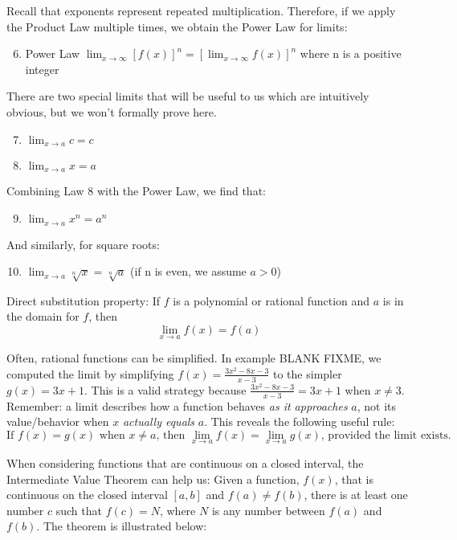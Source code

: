 Recall that exponents represent repeated multiplication. Therefore, if we apply the Product Law multiple times, we obtain the Power Law for limits:
\begin{enumerate}
    \setcounter{enumi}{5}
    \item Power Law $\lim_{x\to\infty} \left[f(x)\right]^n = \left[\lim_{x\to\infty}f(x)\right]^n$ where n is a positive integer
\end{enumerate}
There are two special limits that will be useful to us which are intuitively obvious, but we won't formally prove here.  
\begin{enumerate}
    \setcounter{enumi}{6}
    \item $\lim_{x\to a} \textit{c} = \textit{c}$
    \item $\lim_{x\to a} x = a$
\end{enumerate}
Combining Law 8 with the Power Law, we find that:
\begin{enumerate}
\setcounter{enumi}{8}
    \item $\lim_{x\to a} x^n = a^n$
\end{enumerate}
And similarly, for square roots:
\begin{enumerate}
    \setcounter{enumi}{9}
    \item $\lim_{x\to a} \sqrt[n]{x} = \sqrt[n]{a}$ (if n is even, we assume $a > 0$)
\end{enumerate}

Direct substitution property: If $f$ is a polynomial or rational function and $a$ is in the domain for $f$, then $$\lim_{x \to a}f(x) = f(a)$$

Often, rational functions can be simplified. In example BLANK FIXME, we computed the limit by simplifying $f(x) = \frac{3x^2-8x-3}{x-3}$ to the simpler $g(x) = 3x+1$. This is a valid strategy because $\frac{3x^2-8x-3}{x-3} = 3x+1$ when $x \neq 3$. Remember: a limit describes how a function behaves \textit{as it approaches} $a$, not its value/behavior when $x$ \textit{actually equals} $a$. This reveals the following useful rule: $$\text{If } f(x)=g(x) \text{ when } x \neq a \text{, then } \lim_{x \to a}f(x) = \lim_{x \to a}g(x) \text{, provided the limit exists.}$$

When considering functions that are continuous on a closed interval, the Intermediate Value Theorem can help us: Given a function, $f(x)$, that is continuous on the closed interval $\left[a, b\right]$ and $f(a) \neq f(b)$, there is at least one number $c$ such that $f(c) = N$, where $N$ is any number between $f(a)$ and $f(b)$. The theorem is illustrated below:

